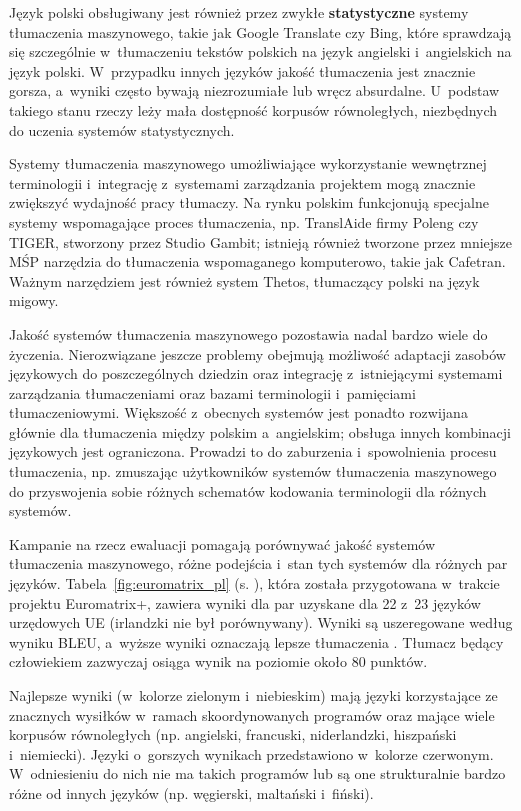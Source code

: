 \begin{multicols}{2}
Język polski obsługiwany jest również przez zwykłe
\textbf{statystyczne} systemy tłumaczenia maszynowego, takie jak
Google Translate czy Bing, które sprawdzają się szczególnie
w~tłumaczeniu tekstów polskich na język angielski i~angielskich na
język polski. W~przypadku innych języków jakość tłumaczenia jest
znacznie gorsza, a~wyniki często bywają niezrozumiałe lub wręcz
absurdalne. U~podstaw takiego stanu rzeczy leży mała dostępność
korpusów równoległych, niezbędnych do uczenia systemów
statystycznych. 

Systemy tłumaczenia maszynowego umożliwiające wykorzystanie
wewnętrznej terminologii i~integrację z~systemami zarządzania
projektem mogą znacznie zwiększyć wydajność pracy tłumaczy. Na
rynku polskim funkcjonują specjalne systemy wspomagające proces
tłumaczenia, np. TranslAide firmy Poleng czy TIGER, stworzony przez
Studio Gambit; istnieją również tworzone przez mniejsze MŚP
narzędzia do tłumaczenia wspomaganego komputerowo, takie jak
Cafetran. Ważnym narzędziem jest również system Thetos,
tłumaczący polski na język migowy. 

Jakość systemów tłumaczenia maszynowego pozostawia nadal bardzo
wiele do życzenia. Nierozwiązane jeszcze problemy obejmują
możliwość adaptacji zasobów językowych do poszczególnych
dziedzin oraz integrację z~istniejącymi systemami zarządzania
tłumaczeniami oraz bazami terminologii i~pamięciami
tłumaczeniowymi. Większość z~obecnych systemów jest ponadto
rozwijana głównie dla tłumaczenia między polskim a~angielskim;
obsługa innych kombinacji językowych jest ograniczona. Prowadzi to
do zaburzenia i~spowolnienia procesu tłumaczenia, np. zmuszając
użytkowników systemów tłumaczenia maszynowego do przyswojenia
sobie różnych schematów kodowania terminologii dla różnych
systemów. 

Kampanie na rzecz ewaluacji pomagają porównywać jakość systemów
tłumaczenia maszynowego, różne podejścia i~stan tych systemów dla
różnych par języków. Tabela~\ref{fig:euromatrix_pl} (s.
\pageref{fig:euromatrix_pl}), która została przygotowana w~trakcie
projektu Euromatrix+, zawiera wyniki dla par uzyskane dla 22 z~23
języków urzędowych UE (irlandzki nie był porównywany). Wyniki są
uszeregowane według wyniku BLEU, a~wyższe wyniki oznaczają lepsze
tłumaczenia \cite{bleu1}. Tłumacz będący człowiekiem zazwyczaj
osiąga wynik na poziomie około 80 punktów. 

Najlepsze wyniki (w~kolorze zielonym i~niebieskim) mają języki
korzystające ze znacznych wysiłków w~ramach skoordynowanych
programów oraz mające wiele korpusów równoległych (np. angielski,
francuski, niderlandzki, hiszpański i~niemiecki). Języki o~gorszych
wynikach przedstawiono w~kolorze czerwonym. W~odniesieniu do nich nie
ma takich programów lub są one strukturalnie bardzo różne od
innych języków (np. węgierski, maltański i~fiński). 


\end{multicols}
